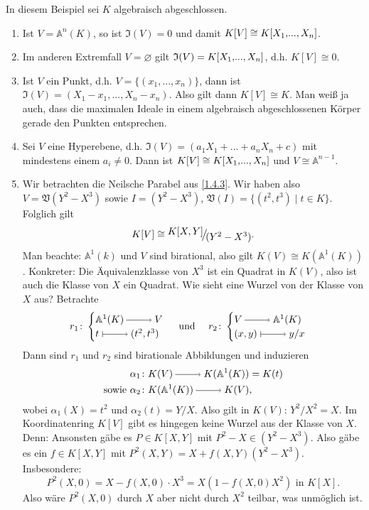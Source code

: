 \documentclass[a4paper,12pt]{scrbook}
\theoremstyle{keinenummern} %
\theoremstyle{mitnummern}
\theoremstyle{unserbeweis}
\def\A{\mathbb{A}}
\def\V{\mathfrak{V}}
\def\I{\mathfrak{I}}
\newcommand{\leer}{\ensuremath{\varnothing}}
\renewcommand{\dotsc}{\ensuremath{\!...}}
\newcommand{\ra}{\raisebox{-1pt}{\tikz{\draw[thin,shorten >=3pt, ->] (0,0) node{\hspace*{-2pt}} -- node{} (1,0);}}\penalty1000\relax}
\renewcommand{\mapsto}{\raisebox{-1pt}{\tikz{\draw[thin,shorten >=3pt, |->] (0,0) node{\hspace*{0pt}} -- node{} (1,0);}}\penalty1000\relax}
\newcommand{\Quotient}[2]{
  \mathchoice
  { %
    \raisebox{0.7ex}{\ensuremath{#1}}
    \ensuremath{\mkern-3mu}\big/\ensuremath{\mkern-3mu}
    \raisebox{-0.6ex}{\ensuremath{#2}}
  }
  { %
    #1/#2
  }
  { %
    #1/#2
  }
  { %
    #1/#2
  }
}
\newcommand{\polyx}[1][n]{\ensuremath%
  [X_{1},\dotsc,X_{#1}]}
\begin{document}
\begin{bsp}\label{1.4.8} In diesem Beispiel sei $K$ algebraisch abgeschlossen.
\begin{enumerate}
\item{} Ist $V=\A^n(K)$, so ist $\I(V)=0$ und damit $K[V]\cong K\polyx$.
\item{} Im anderen Extremfall $V=\leer$ gilt $\I(V)=K\polyx$, d.h. $K[V]\cong 0$.
\item{} Ist $V$ ein Punkt, d.h. $V=\{(x_1,\dotsc,x_n)\}$, dann ist $\I(V)=(X_1-x_1,\dotsc,X_n-x_n)$. Also gilt dann $K[V]\cong K$. Man weiß ja auch, dass die maximalen Ideale in einem algebraisch abgeschlossenen Körper gerade den Punkten entsprechen.
\item{} Sei $V$ eine Hyperebene, d.h. $\I(V)=(a_1X_1+\dotsc+a_nX_n+c)$ mit mindestens einem $a_i\neq 0$.
Dann ist $K[V]\cong K\polyx$ und $V\cong \A^{n-1}$.
\item{} Wir betrachten die Neilsche Parabel aus \cref{1.4.3}. Wir haben also $V=\V(Y^2-X^3)$ sowie $I=(Y^2-X^3)$,
  $\V(I)=\{(t^2,t^3) \mid t\in K\}$. Folglich gilt
\[K[V]\cong \Quotient{K[X,Y]}{(Y^2-X^3)}.\] 
Man beachte: $\A^1(k)$ und $V$ sind birational, also gilt $K(V)\cong K(\A^1(K))$. Konkreter:
Die Äquivalenzklasse von $X^3$ ist ein Quadrat in $K(V)$, also ist auch die Klasse von $X$ ein Quadrat.
Wie sieht eine Wurzel von der Klasse von $X$ aus? Betrachte  
\[r_1\colon  \begin{cases} \A^1(K)\ra V \\ t\mapsto (t^2,t^3) \end{cases} \text{ und \quad  } r_2\colon  \begin{cases} V\ra \A^1(K) \\ (x,y) \mapsto y/x\end{cases}\]
Dann sind $r_1$ und $r_2$ sind birationale Abbildungen und induzieren 
\begin{align*}&\alpha_1\colon  K(V)\ra K(\A^1(K))=K(t)\\
\text{sowie }&\alpha_2\colon  K(\A^1(K))\ra K(V),\end{align*}
wobei $\alpha_1(X)=t^2$ und $\alpha_2(t)=Y/X$. Also gilt in $K(V)$: $Y^2/X^2=X$.
Im Koordinatenring $K[V]$ gibt es hingegen keine Wurzel aus der Klasse von $X$. Denn:
Ansonsten gäbe es $P \in K[X,Y]$ mit $P^2-X \in (Y^2-X^3)$. Also gäbe es ein $f \in K[X,Y]$ mit $P^2(X,Y)=X+f(X,Y)(Y^2-X^3)$.
Insbesondere:
 \[P^2(X,0)=X-f(X,0)\cdot X^3=X(1-f(X,0)X^2)\text{ in } K[X].\]
 Also wäre $P^2(X,0)$ durch $X$ aber nicht durch $X^2$ teilbar, was unmöglich ist.
\end{enumerate}
\end{bsp}
\end{document}
